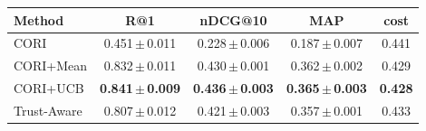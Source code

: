 \begin{tabular}{l cccc}
\toprule
Method & R@1 & nDCG@10 & MAP & cost \\
\midrule
CORI & 0.451\,$\pm$\,0.011 & 0.228\,$\pm$\,0.006 & 0.187\,$\pm$\,0.007 & 0.441 \\
CORI+Mean & 0.832\,$\pm$\,0.011 & 0.430\,$\pm$\,0.001 & 0.362\,$\pm$\,0.002 & 0.429 \\
CORI+UCB & \textbf{0.841\,$\pm$\,0.009} & \textbf{0.436\,$\pm$\,0.003} & \textbf{0.365\,$\pm$\,0.003} & \textbf{0.428} \\
Trust-Aware & 0.807\,$\pm$\,0.012 & 0.421\,$\pm$\,0.003 & 0.357\,$\pm$\,0.001 & 0.433 \\
\bottomrule
\end{tabular}
